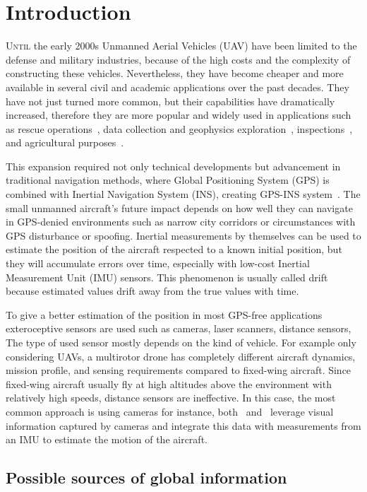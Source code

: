 \chapter{Introduction}

\lettrine{U}{ntil} the early 2000s Unmanned Aerial Vehicles (UAV) have been limited to the defense and military industries, because of the high costs and the complexity of constructing these vehicles. Nevertheless, they have become cheaper and more available in several civil and academic applications over the past decades. They have not just turned more common, but their capabilities have dramatically increased, therefore they are more popular and widely used in applications such as rescue operations~\cite{rescue-operations}, data collection and geophysics exploration~\cite{data-collection}, inspections~\cite{inspection}, and agricultural purposes~\cite{agriculure}.

This expansion required not only technical developments but advancement in traditional navigation methods, where Global Positioning System (GPS) is combined with Inertial Navigation System (INS), creating GPS-INS system~\cite{gps-ins}. The small unmanned aircraft's future impact depends on how well they can navigate in GPS-denied environments such as narrow city corridors or circumstances with GPS disturbance or spoofing.  Inertial measurements by themselves can be used to estimate the position of the aircraft respected to a known initial position, but they will accumulate errors over time, especially with low-cost Inertial Measurement Unit (IMU) sensors. This phenomenon is usually called drift because estimated values drift away from the true values with time.

To give a better estimation of the position in most GPS-free applications exteroceptive sensors are used such as cameras, laser scanners, distance sensors, \etc{} The type of used sensor mostly depends on the kind of vehicle. For example only considering UAVs, a multirotor drone has completely different aircraft dynamics, mission profile, and sensing requirements compared to fixed-wing aircraft. Since fixed-wing aircraft usually fly at high altitudes above the environment with relatively high speeds, distance sensors are ineffective. In this case, the most common approach is using cameras for instance, both~\cite{gps-ins-cam} and~\cite{rel-nav} leverage visual information captured by cameras and integrate this data with measurements from an IMU to estimate the motion of the aircraft. 

\section{Possible sources of global information}

